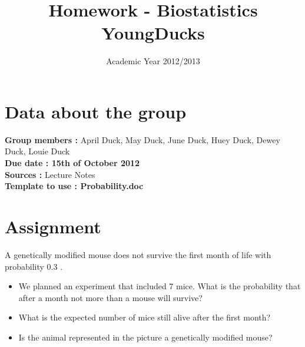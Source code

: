 \documentclass{article}
\title{Homework - Biostatistics \bf{ YoungDucks }}
\date{Academic Year 2012/2013}
\begin{document}
\maketitle{}
\section{ Data about the group }{\bf Group members : }April Duck, May Duck, June Duck, Huey Duck, Dewey Duck, Louie Duck\\{\bf Due date : 15th of October 2012 }\\{\bf Sources : }Lecture Notes\\{\bf Template to use : Probability.doc }\\\section{ Assignment }
A genetically modified mouse does not survive the first month of life with probability 0.3 . \\\begin{itemize}
\item  We planned an experiment that included 7 mice. What is the probability that after a month not more than a mouse will survive? 
\item What is the expected number of mice still alive after the first month? 
\item Is the animal represented in the picture a genetically modified mouse?
\end{itemize}
\vspace{\baselineskip} {\bf  }\newpage
\end{document}

